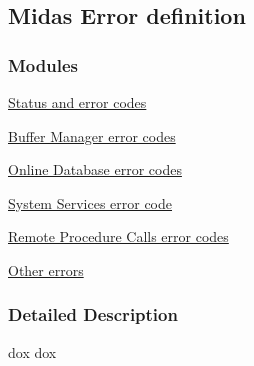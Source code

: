 \subsection{Midas Error definition}
\label{group__mdeferrorh}
\subsubsection*{Modules}
\begin{DoxyCompactItemize}
\item 
\hyperlink{group__err21}{Status and error codes}
\item 
\hyperlink{group__err22}{Buffer Manager error codes}
\item 
\hyperlink{group__err23}{Online Database error codes}
\item 
\hyperlink{group__err24}{System Services error code}
\item 
\hyperlink{group__err25}{Remote Procedure Calls error codes}
\item 
\hyperlink{group__err26}{Other errors}
\end{DoxyCompactItemize}


\subsubsection{Detailed Description}
dox dox 